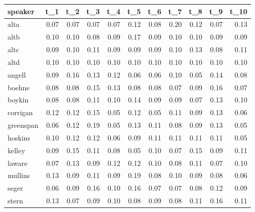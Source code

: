 \begin{tabular}{lrrrrrrrrrr}
\toprule
   speaker &  t\_1 &  t\_2 &  t\_3 &  t\_4 &  t\_5 &  t\_6 &  t\_7 &  t\_8 &  t\_9 &  t\_10 \\
\midrule
      alta & 0.07 & 0.07 & 0.07 & 0.07 & 0.12 & 0.08 & 0.20 & 0.12 & 0.07 &  0.13 \\
      altb & 0.10 & 0.10 & 0.08 & 0.09 & 0.17 & 0.09 & 0.10 & 0.10 & 0.09 &  0.09 \\
      altc & 0.09 & 0.10 & 0.11 & 0.09 & 0.09 & 0.09 & 0.10 & 0.13 & 0.08 &  0.11 \\
      altd & 0.10 & 0.10 & 0.10 & 0.10 & 0.10 & 0.10 & 0.10 & 0.10 & 0.10 &  0.10 \\
    angell & 0.09 & 0.16 & 0.13 & 0.12 & 0.06 & 0.06 & 0.10 & 0.05 & 0.14 &  0.08 \\
    boehne & 0.08 & 0.08 & 0.15 & 0.13 & 0.08 & 0.08 & 0.07 & 0.09 & 0.16 &  0.07 \\
    boykin & 0.08 & 0.08 & 0.11 & 0.10 & 0.14 & 0.09 & 0.09 & 0.07 & 0.13 &  0.10 \\
  corrigan & 0.12 & 0.12 & 0.15 & 0.05 & 0.12 & 0.05 & 0.11 & 0.09 & 0.13 &  0.06 \\
 greenspan & 0.06 & 0.12 & 0.19 & 0.05 & 0.13 & 0.11 & 0.08 & 0.09 & 0.13 &  0.05 \\
   hoskins & 0.10 & 0.12 & 0.12 & 0.06 & 0.09 & 0.11 & 0.11 & 0.11 & 0.11 &  0.05 \\
    kelley & 0.09 & 0.15 & 0.11 & 0.08 & 0.05 & 0.10 & 0.07 & 0.15 & 0.09 &  0.11 \\
    laware & 0.07 & 0.13 & 0.09 & 0.12 & 0.12 & 0.10 & 0.08 & 0.11 & 0.07 &  0.10 \\
   mullins & 0.13 & 0.09 & 0.11 & 0.09 & 0.19 & 0.08 & 0.10 & 0.09 & 0.08 &  0.06 \\
     seger & 0.06 & 0.09 & 0.16 & 0.10 & 0.16 & 0.07 & 0.07 & 0.08 & 0.12 &  0.09 \\
     stern & 0.13 & 0.07 & 0.09 & 0.10 & 0.08 & 0.09 & 0.08 & 0.11 & 0.16 &  0.11 \\
\bottomrule
\end{tabular}
